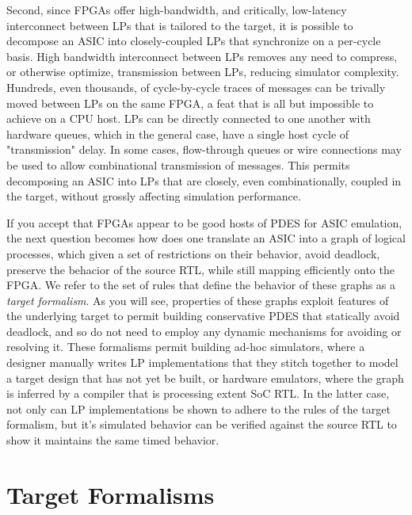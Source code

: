 Second, since FPGAs offer high-bandwidth, and critically, low-latency
interconnect between LPs that is tailored to the target, it is possible to
decompose an ASIC into closely-coupled LPs that synchronize on a per-cycle
basis. High bandwidth interconnect between LPs removes any need to compress, or
otherwise optimize, transmission between LPs, reducing simulator complexity.
Hundreds, even thousands, of cycle-by-cycle traces of messages can be trivally
moved between LPs on the same FPGA, a feat that is all but impossible to
achieve on a CPU host. LPs can be directly connected to one another with
hardware queues, which in the general case, have a single host cycle of
"transmission" delay. In some cases, flow-through queues or wire connections
may be used to allow combinational transmission of messages. This permits
decomposing an ASIC into LPs that are closely, even combinationally, coupled in
the target, without grossly affecting simulation performance.

If you accept that FPGAs appear to be good hosts of PDES for ASIC emulation,
the next question becomes how does one translate an ASIC into a graph of
logical processes, which given a set of restrictions on their behavior, avoid
deadlock, preserve the behacior of the source RTL, while still mapping
efficiently onto the FPGA. We refer to the set of rules that define the
behavior of these graphs as a \emph{target formalism}.  As you will see,
properties of these graphs exploit features of the underlying target to permit
building conservative PDES that statically avoid deadlock, and so do not need
to employ any dynamic mechanisms for avoiding or resolving it. %
These formalisms permit building ad-hoc simulators, where a designer manually
writes LP implementations that they stitch together to model a target design
that has not yet be built, or hardware emulators, where the graph is inferred by a compiler that is processing extent SoC RTL. In
the latter case, not only can LP implementations be shown to adhere to the
rules of the target formalism, but it's simulated behavior can be verified
against the source RTL to show it maintains the same timed behavior.

\section{Target Formalisms}

